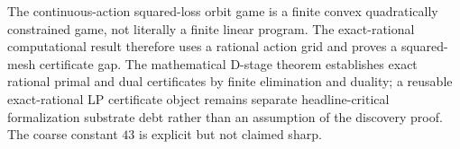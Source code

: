 The continuous-action squared-loss orbit game is a finite convex quadratically constrained game, not literally a finite linear program. The exact-rational computational result therefore uses a rational action grid and proves a squared-mesh certificate gap. The mathematical D-stage theorem establishes exact rational primal and dual certificates by finite elimination and duality; a reusable exact-rational LP certificate object remains separate headline-critical formalization substrate debt rather than an assumption of the discovery proof. The coarse constant \(43\) is explicit but not claimed sharp.